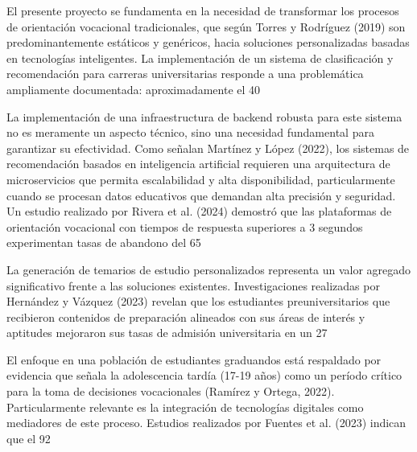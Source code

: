 El presente proyecto se fundamenta en la necesidad de transformar los procesos de orientación vocacional tradicionales, que según Torres y Rodríguez (2019) son predominantemente estáticos y genéricos, hacia soluciones personalizadas basadas en tecnologías inteligentes. La implementación de un sistema de clasificación y recomendación para carreras universitarias responde a una problemática ampliamente documentada: aproximadamente el 40%

La implementación de una infraestructura de backend robusta para este sistema no es meramente un aspecto técnico, sino una necesidad fundamental para garantizar su efectividad. Como señalan Martínez y López (2022), los sistemas de recomendación basados en inteligencia artificial requieren una arquitectura de microservicios que permita escalabilidad y alta disponibilidad, particularmente cuando se procesan datos educativos que demandan alta precisión y seguridad. Un estudio realizado por Rivera et al. (2024) demostró que las plataformas de orientación vocacional con tiempos de respuesta superiores a 3 segundos experimentan tasas de abandono del 65%

La generación de temarios de estudio personalizados representa un valor agregado significativo frente a las soluciones existentes. Investigaciones realizadas por Hernández y Vázquez (2023) revelan que los estudiantes preuniversitarios que recibieron contenidos de preparación alineados con sus áreas de interés y aptitudes mejoraron sus tasas de admisión universitaria en un 27%

El enfoque en una población de estudiantes graduandos está respaldado por evidencia que señala la adolescencia tardía (17-19 años) como un período crítico para la toma de decisiones vocacionales (Ramírez y Ortega, 2022). Particularmente relevante es la integración de tecnologías digitales como mediadores de este proceso. Estudios realizados por Fuentes et al. (2023) indican que el 92%

